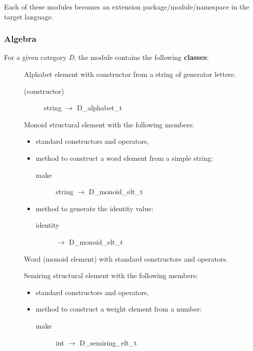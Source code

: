 Each of these modules becomes an extension package/module/namespace in
the target language.

\subsubsection{Algebra}

For a given category \emph{D}, the module
 contains the following \textbf{classes}:

\begin{description}
\item[] Alphabet element with constructor from a
  string of generator letters:
  \begin{description}
  \item[(constructor)] string $\to$ D\_alphabet\_t
  \end{description}
\item[] Monoid structural element with the
  following members:
  \begin{itemize}
  \item standard \Vauc constructors and operators,
  \item method to construct a word element from a simple string:
    \begin{description}
    \item[make] string $\to$ D\_monoid\_elt\_t
    \end{description}
  \item method to generate the identity value:
    \begin{description}
    \item[identity] $\to$ D\_monoid\_elt\_t
    \end{description}
  \end{itemize}
\item[] Word (monoid element) with standard
  \Vauc constructors and operators.
\item[] Semiring structural element with the
  following members:
  \begin{itemize}
  \item standard \Vauc constructors and operators,
  \item method to construct a weight element from a number:
    \begin{description}
    \item[make] int $\to$ D\_semiring\_elt\_t
    \end{description}

\end{itemize}
\end{description}
